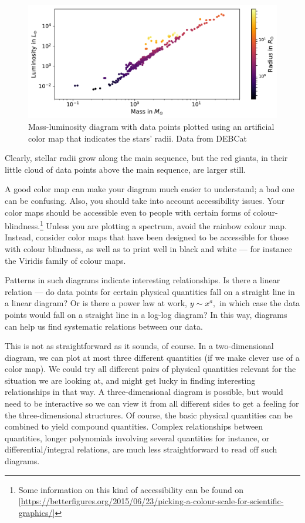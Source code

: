 \documentclass[twocolumn,apj]{openjournal}
\begin{document}
\begin{figure}[htbp]
\begin{center}
\includegraphics[width=\linewidth]{masse-leuchtkraft-radius-color-DEB.pdf}
\caption{Mass-luminosity diagram with data points plotted using an artificial color map that indicates the stars' radii. Data from DEBCat}
\label{MassLumRadiusColor}
\end{center}
\end{figure}
Clearly, stellar radii grow along the main sequence, but the red giants, in their little cloud of data points above the main sequence, are larger still.

A good color map can make your diagram much easier to understand; a bad one can be confusing. Also, you should take into account accessibility issues. Your color maps should be accessible even to people with certain forms of colour-blindness.\footnote{Some information on this kind of accessibility can be found on [\href{https://betterfigures.org/2015/06/23/picking-a-colour-scale-for-scientific-graphics/}{https://betterfigures.org/2015/06/23/picking-a-colour-scale-for-scientific-graphics/}]} Unless you are plotting a spectrum, avoid the rainbow colour map. Instead, consider color maps that have been designed to be accessible for those with colour blindness, as well as to print well in black and white --- for instance the Viridis family of colour maps.

Patterns in such diagrams indicate interesting relationships. Is there a linear relation --- do data points for certain physical quantities fall on a straight line in a linear diagram? Or is there a power law at work, $y\sim x^a,$ in which case the data points would fall on a straight line in a log-log diagram? In this way, diagrams can help us find systematic relations between our data. 

This is not as straightforward as it sounds, of course. In a two-dimensional diagram, we can plot at most three different quantities (if we make clever use of a color map). We could try all different pairs of physical quantities relevant for the situation we are looking at, and might get lucky in finding interesting relationships in that way. A three-dimensional diagram is possible, but would need to be interactive so we can view it from all different sides to get a feeling for the three-dimensional structures. Of course, the basic physical quantities can be combined to yield compound quantities. Complex relationships between quantities, longer polynomials involving several quantities for instance, or differential/integral relations, are much less straightforward to read off such diagrams.
\end{document}
